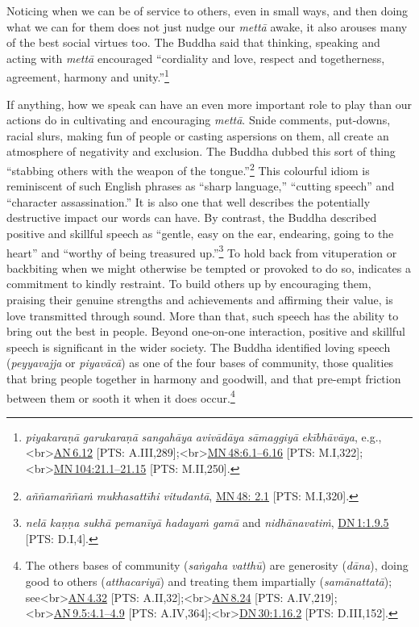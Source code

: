 \documentclass[10pt, openright]{book}
\begin{document}
Noticing when we can be of service to others, even in small ways, and then doing what we can for them does not just nudge our \textit{mettā} awake, it also arouses many of the best social virtues too. The Buddha said that thinking, speaking and acting with \textit{mettā} encouraged “cordiality and love, respect and togetherness, agreement, harmony and unity.”\footnote {\textit{piyakaraṇā} \textit{garukaraṇā} \textit{sangahāya} \textit{avivādāya} \textit{sāmaggiyā} \textit{ekībhāvāya}, e.g.,<br>\href{https://suttacentral.net/an6.12/en/sujato}{AN 6.12} [PTS: A.III,289];<br>\href{https://suttacentral.net/mn48/en/sujato\#6.1}{MN 48:6.1–6.16} [PTS: M.I,322];<br>\href{https://suttacentral.net/mn104/en/sujato\#21.1}{MN 104:21.1–21.15} [PTS: M.II,250].}


If anything, how we speak can have an even more important role to play than our actions do in cultivating and encouraging \textit{mettā}. Snide comments, put-downs, racial slurs, making fun of people or casting aspersions on them, all create an atmosphere of negativity and exclusion. The Buddha dubbed this sort of thing “stabbing others with the weapon of the tongue.”\footnote {\textit{aññamaññaṁ mukhasattīhi vitudantā}, \href{https://suttacentral.net/mn48/en/sujato\#2.1}{MN 48: 2.1} [PTS: M.I,320].} This colourful idiom is reminiscent of such English phrases as “sharp language,” “cutting speech” and “character assassination.” It is also one that well describes the potentially destructive impact our words can have. By contrast, the Buddha described positive and skillful speech as “gentle, easy on the ear, endearing, going to the heart” and “worthy of being treasured up.”\footnote {\textit{nelā kaṇṇa sukhā pemanīyā hadayaṁ gamā} and \textit{nidhānavatiṁ}, \href{https://suttacentral.net/dn1/en/sujato\#1.9.5}{DN 1:1.9.5} [PTS: D.I,4].} To hold back from vituperation or backbiting when we might otherwise be tempted or provoked to do so, indicates a commitment to kindly restraint. To build others up by encouraging them, praising their genuine strengths and achievements and affirming their value, is love transmitted through sound. More than that, such speech has the ability to bring out the best in people. Beyond one-on-one interaction, positive and skillful speech is significant in the wider society. The Buddha identified loving speech (\textit{peyyavajja} or \textit{piyavācā}) as one of the four bases of community, those qualities that bring people together in harmony and goodwill, and that pre-empt friction between them or sooth it when it does occur.\footnote {The others bases of community (\textit{saṅgaha vatthū}) are generosity (\textit{dāna}), doing good to others (\textit{atthacariyā}) and treating them impartially (\textit{samānattatā}); see<br>\href{https://suttacentral.net/an4.32/en/sujato}{AN 4.32} [PTS: A.II,32];<br>\href{https://suttacentral.net/an8.24/en/sujato}{AN 8.24} [PTS: A.IV,219];<br>\href{https://suttacentral.net/an9.5/en/sujato\#4.1}{AN 9.5:4.1–4.9} [PTS: A.IV,364];<br>\href{https://suttacentral.net/dn30/en/sujato\#1.16.2}{DN 30:1.16.2} [PTS: D.III,152].}
\end{document}
